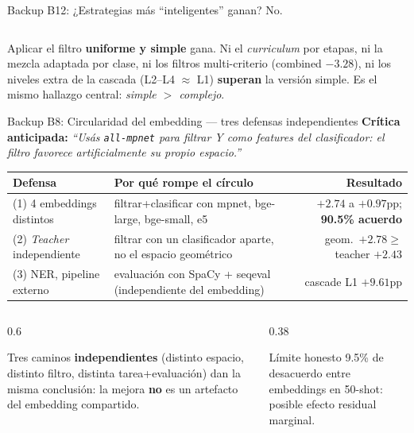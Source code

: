 \begin{frame}{Backup B12: ¿Estrategias más ``inteligentes'' ganan? No.}
\begin{columns}[T]
\end{columns}

\vspace{0.3em}
\begin{insight}
\scriptsize Aplicar el filtro \textbf{uniforme y simple} gana. Ni el \emph{curriculum} por etapas, ni la mezcla adaptada por clase, ni los filtros multi-criterio (combined $-3{.}28$), ni los niveles extra de la cascada (L2--L4 $\approx$ L1) \textbf{superan} la versión simple. Es el mismo hallazgo central: \emph{simple $>$ complejo}.
\end{insight}
\end{frame}

\begin{frame}{Backup B8: Circularidad del embedding --- tres defensas independientes}
\small
\textbf{Crítica anticipada:} \textit{``Usás \texttt{all-mpnet} para filtrar Y como \textit{features} del clasificador: el filtro favorece artificialmente su propio espacio.''}

\vspace{0.5em}
\centering
\scriptsize
\setlength{\tabcolsep}{5pt}
\renewcommand{\arraystretch}{1.35}
\begin{tabular}{@{}p{2.9cm}p{5.0cm}r@{}}
\toprule
\textbf{Defensa} & \textbf{Por qué rompe el círculo} & \textbf{Resultado} \\
\midrule
\rowcolor{uaigreen!8}
(1) 4 embeddings distintos & filtrar+clasificar con mpnet, bge-large, bge-small, e5 & $+2{.}74$ a $+0{.}97$pp; \textbf{90.5\% acuerdo} \\
(2) \textit{Teacher} independiente & filtrar con un clasificador aparte, no el espacio geométrico & geom.\ $+2{.}78 \geq$ teacher $+2{.}43$ \\
\rowcolor{uaigreen!8}
(3) NER, pipeline externo & evaluación con SpaCy + seqeval (independiente del embedding) & cascade L1 $+9{.}61$pp \\
\bottomrule
\end{tabular}

\vspace{0.5em}
\begin{columns}[T]
\begin{column}{0.6\textwidth}
\begin{insight}
\scriptsize Tres caminos \textbf{independientes} (distinto espacio, distinto filtro, distinta tarea+evaluación) dan la misma conclusión: la mejora \textbf{no} es un artefacto del embedding compartido.
\end{insight}
\end{column}
\begin{column}{0.38\textwidth}
\begin{block}{\small Límite honesto}
\scriptsize 9.5\% de desacuerdo entre embeddings en 50-shot: posible efecto residual marginal.
\end{block}
\end{column}
\end{columns}
\end{frame}


